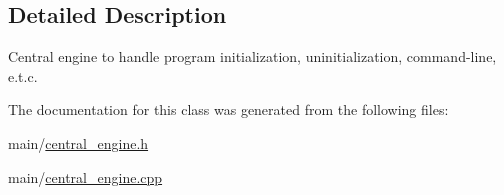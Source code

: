 \subsection{Detailed Description}
Central engine to handle program initialization, uninitialization, command-\/line, e.\-t.\-c. 

The documentation for this class was generated from the following files\-:\begin{DoxyCompactItemize}
\item 
main/\hyperlink{central__engine_8h}{central\-\_\-engine.\-h}\item 
main/\hyperlink{central__engine_8cpp}{central\-\_\-engine.\-cpp}\end{DoxyCompactItemize}
